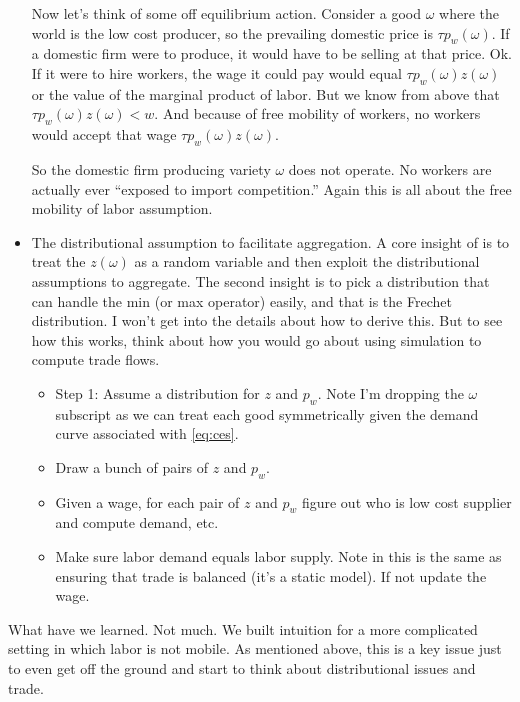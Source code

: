 \documentclass[pdftex,12pt]{article}
\begin{document}
\begin{itemize}
    Now let's think of some off equilibrium action. Consider a good $\omega$ where the world is the low cost producer, so the prevailing domestic price is $\tau p_w(\omega)$. If a domestic firm were to produce, it would have to be selling at that price. Ok. If it were to hire workers, the wage it could pay would equal $\tau p_w(\omega) z(\omega)$ or the value of the marginal product of labor. But we know from above that
$\tau p_w(\omega) z(\omega) < w$. And because of free mobility of workers, no workers would accept that wage $\tau p_w(\omega) z(\omega)$.

So the domestic firm producing variety $\omega$ does not operate. No workers are actually ever ``exposed to import competition.'' Again this is all about the free mobility of labor assumption.

\item The distributional assumption to facilitate aggregation. A core insight of \citet{eaton2002technology} is to treat the $z(\omega)$ as a random variable and then exploit the distributional assumptions to aggregate. The second insight is to pick a distribution that can handle the min (or max operator) easily, and that is the Frechet distribution. I won't get into the details about how to derive this. But to see how this works, think about how you would go about using simulation to compute trade flows.
\begin{itemize}
\item Step 1: Assume a distribution for $z$ and $p_w$. Note I'm dropping the $\omega$ subscript as we can treat each good symmetrically given the demand curve associated with \ref{eq:ces}.

\item Draw a bunch of pairs of $z$ and $p_w$.

\item Given a wage, for each pair of $z$ and $p_w$ figure out who is low cost supplier and compute demand, etc.

\item Make sure labor demand equals labor supply. Note in this is the same as ensuring that trade is balanced (it's a static model). If not update the wage.
\end{itemize}
\end{itemize}
What have we learned. Not much. We built intuition for a more complicated setting in which labor is not mobile. As mentioned above, this is a key issue just to even get off the ground and start to think about distributional issues and trade.
\end{document}

